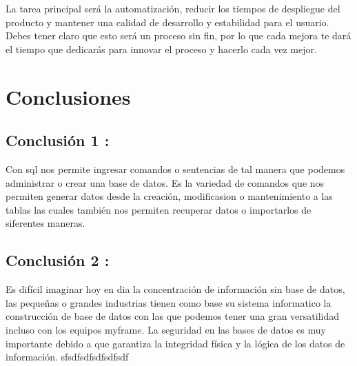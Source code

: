 \documentclass[preprint,12pt]{elsarticle}
\begin{document}
La tarea principal será la automatización, reducir los tiempos de despliegue del producto y mantener una calidad de desarrollo y estabilidad para el usuario. Debes tener claro que esto será un proceso sin fin, por lo que cada mejora te dará el tiempo que dedicarás para innovar el proceso y hacerlo cada vez mejor.


\section{Conclusiones}

\subsection{Conclusión 1 : }	
Con sql nos permite ingresar comandos o sentencias de tal manera que podemos administrar o crear una base de datos.
Es la variedad de comandos que nos permiten generar datos desde la creación, modificasion o mantenimiento a las tablas las cuales también nos permiten recuperar datos o importarlos de siferentes maneras.

\subsection{Conclusión 2 : }	
Es difícil imaginar hoy en dia la concentración de información sin base de datos, las pequeñas o grandes industrias tienen como base su sistema informatico la construcción de base de datos con las que podemos tener una gran versatilidad incluso con los equipos myframe.
La seguridad en las bases de datos es muy importante debido a que garantiza la integridad física y la lógica de los datos de información.
sfsdfsdfsdfsdfsdf


	
	

	
	\newpage
	
		 
\citep{DLake01}  
\citep{DLake02}  
\citep{DWarehouse01}  
\citep{DWarehouse02}   
	
\end{document}
